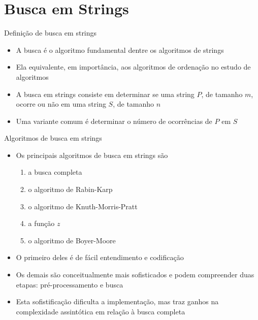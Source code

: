\section{Busca em Strings}


\begin{frame}[fragile]{Definição de busca em strings}

    \begin{itemize}
        \item A busca é o algoritmo fundamental dentre os algoritmos de strings 
        \pause

        \item Ela equivalente, em importância, aos algoritmos de ordenação no estudo de algoritmos
        \pause

        \item A busca em strings consiste em determinar se uma string $P$, de tamanho $m$, ocorre 
            ou não em uma string $S$, de tamanho $n$
        \pause

        \item Uma variante comum é determinar o número de ocorrências de $P$ em $S$
    \end{itemize}

\end{frame}

\begin{frame}[fragile]{Algoritmos de busca em strings}

    \begin{itemize}
        \item Os principais algoritmos de busca em strings são
        \begin{enumerate}
            \item a busca completa
            \item o algoritmo de Rabin-Karp
            \item o algoritmo de Knuth-Morris-Pratt
            \item a função $z$
            \item o algoritmo de Boyer-Moore
        \end{enumerate}
        \pause


        \item O primeiro deles é de fácil entendimento e codificação
        \pause


        \item Os demais são conceitualmente mais sofisticados e podem compreender duas etapas:
            pré-processamento e busca
        \pause


        \item Esta sofistificação dificulta a implementação, mas traz ganhos na complexidade
            assintótica em relação à busca completa
    \end{itemize}

\end{frame}
